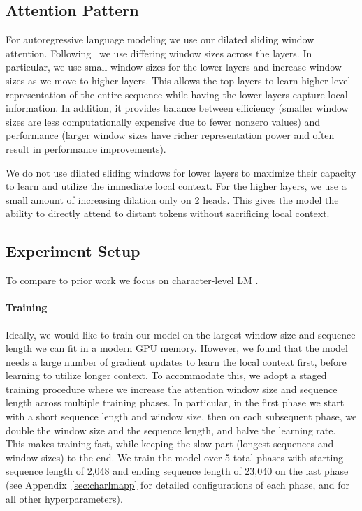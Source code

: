 \documentclass[11pt,a4paper]{article}
\begin{document}
\subsection{Attention Pattern}
\label{sec:charlm_attn}
For autoregressive language modeling we use our dilated 
sliding window attention. 
Following~\citet{adaptivespan} we use differing window sizes across the layers. In particular, we use small window sizes for the lower layers and increase window sizes 
as we move to higher layers. This allows the top layers to learn higher-level representation of the entire sequence while having the lower layers capture local information. In addition, it provides balance between efficiency (smaller window sizes are less computationally expensive due to fewer nonzero values)
and performance (larger window sizes have richer representation power and often result in performance improvements). 

We do not use dilated sliding windows for lower layers to maximize their capacity to learn and utilize the immediate local context.
For the higher layers, we use a small amount of increasing dilation only on 2 heads.
This gives the model the ability to directly attend to distant tokens without sacrificing local context.







\subsection{Experiment Setup}

To compare to prior work we focus on character-level LM \cite[\texttt{text8} and \texttt{enwik8};][]{text8}.


\paragraph{Training}
Ideally, we would like to train our model on the largest window size and sequence length we can fit in a modern GPU memory. However, we found that 
the model needs a large number of gradient updates to learn the local context
first, before learning to utilize longer context. 
To accommodate this, we adopt a staged training procedure where we increase the attention window size and sequence length across multiple training phases. In particular, in the first phase we start with a short sequence length and window size, then on each subsequent phase, we double the window size and the sequence length, and halve the learning rate. 
This makes training fast, while keeping the slow part 
(longest sequences and window sizes) to the end. 
We train the model over 5 total phases with starting sequence length of 2,048 and ending sequence length of 23,040 
on the last phase (see Appendix~\ref{sec:charlmapp} for detailed configurations of each phase, and for all other hyperparameters).
\end{document}
